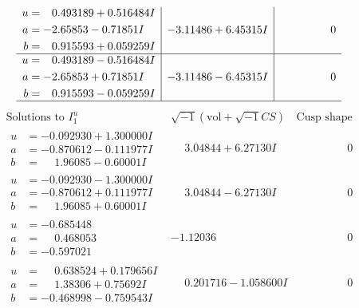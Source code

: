 \documentclass[1p]{elsarticle_modified}
\theoremstyle{definition}
\newcommand{\I}{\sqrt{-1}}
\begin{document}
$$\begin{array}{c|c|c}
\begin{aligned}
u &= \phantom{-}0.493189 + 0.516484 I \\
a &= -2.65853 - 0.71851 I \\
b &= \phantom{-}0.915593 + 0.059259 I\end{aligned}
 & -3.11486 + 6.45315 I & \phantom{-0.000000 } 0 \\ \hline\begin{aligned}
u &= \phantom{-}0.493189 - 0.516484 I \\
a &= -2.65853 + 0.71851 I \\
b &= \phantom{-}0.915593 - 0.059259 I\end{aligned}
 & -3.11486 - 6.45315 I & \phantom{-0.000000 } 0\\
 \hline 
 \end{array}$$\newpage$$\begin{array}{c|c|c}  
\text{Solutions to }I^u_{1}& \I (\text{vol} + \sqrt{-1}CS) & \text{Cusp shape}\\
 \hline 
\begin{aligned}
u &= -0.092930 + 1.300000 I \\
a &= -0.870612 - 0.111977 I \\
b &= \phantom{-}1.96085 - 0.60001 I\end{aligned}
 & \phantom{-}3.04844 + 6.27130 I & \phantom{-0.000000 } 0 \\ \hline\begin{aligned}
u &= -0.092930 - 1.300000 I \\
a &= -0.870612 + 0.111977 I \\
b &= \phantom{-}1.96085 + 0.60001 I\end{aligned}
 & \phantom{-}3.04844 - 6.27130 I & \phantom{-0.000000 } 0 \\ \hline\begin{aligned}
u &= -0.685448\phantom{ +0.000000I} \\
a &= \phantom{-}0.468053\phantom{ +0.000000I} \\
b &= -0.597021\phantom{ +0.000000I}\end{aligned}
 & -1.12036\phantom{ +0.000000I} & \phantom{-0.000000 } 0 \\ \hline\begin{aligned}
u &= \phantom{-}0.638524 + 0.179656 I \\
a &= \phantom{-}1.38306 + 0.75692 I \\
b &= -0.468998 - 0.759543 I\end{aligned}
 & \phantom{-}0.201716 - 1.058600 I & \phantom{-0.000000 } 0 \\ \hline\begin{aligned}

\end{aligned}
\end{array}$$
\end{document}
